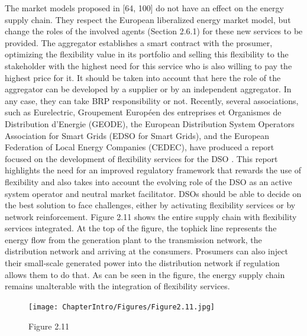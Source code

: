 The market models proposed in \cite{USEFFoundation2015a, MarketDesignENTSOE} [64, 100] do not have an effect on the energy supply chain. They respect the European liberalized energy market model, but change the roles of the involved agents (Section 2.6.1) for these new services to be provided. The aggregator establishes a smart contract with the prosumer, optimizing the flexibility value in its portfolio and selling this flexibility to the stakeholder with the highest need for this service who is also willing to pay the highest price for it. It should be taken into account that here the role of the aggregator can be developed by a supplier or by an independent aggregator. In any case, they can take BRP responsibility or not.
Recently, several associations, such as Eurelectric, Groupement Européen des entreprises et Organismes de Distribution d'Energie (GEODE), the European Distribution System Operators Association for Smart Grids (EDSO for Smart Grids), and the European Federation of Local Energy Companies (CEDEC), have produced a report focused on the development of flexibility services for the DSO \cite{edso2018flexibility}. This report highlights the need for an improved regulatory framework that rewards the use of flexibility and also takes into account the evolving role of the DSO as an active system operator and neutral market facilitator. DSOs should be able to decide on the best solution to face challenges, either by activating flexibility services or by network reinforcement.
Figure 2.11 shows the entire supply chain with flexibility services integrated. At the top of the figure, the tophick line represents the energy flow from the generation plant to the transmission network, the distribution network and arriving at the consumers. Prosumers can also inject their small-scale generated power into the distribution network if regulation allows them to do that. As can be seen in the figure, the energy supply chain remains unalterable with the integration of flexibility services.

\begin{figure}[]
	\centering
	\texttt{[image: ChapterIntro/Figures/Figure2.11.jpg]}
		\caption{Figure 2.11}  
\end{figure}

